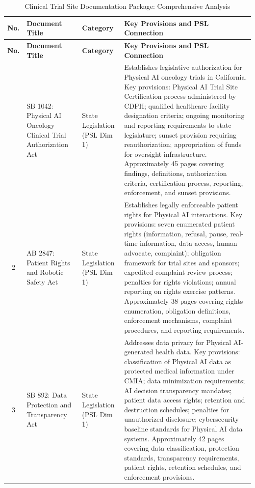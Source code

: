 \begin{longtable}{c l l p{8cm}}
\caption{Clinical Trial Site Documentation Package: Comprehensive Analysis}
\label{tab:site-docs-comprehensive} \\
\toprule
\textbf{No.} & \textbf{Document Title} & \textbf{Category} & \textbf{Key Provisions and PSL Connection} \\
\midrule
\endfirsthead
\toprule
\textbf{No.} & \textbf{Document Title} & \textbf{Category} & \textbf{Key Provisions and PSL Connection} \\
\midrule
\endhead
\bottomrule
\endfoot
1 & SB 1042: Physical AI Oncology Clinical Trial Authorization Act & State Legislation (PSL Dim 1) & Establishes legislative authorization for Physical AI oncology trials in California. Key provisions: Physical AI Trial Site Certification process administered by CDPH; qualified healthcare facility designation criteria; ongoing monitoring and reporting requirements to state legislature; sunset provision requiring reauthorization; appropriation of funds for oversight infrastructure. Approximately 45 pages covering findings, definitions, authorization criteria, certification process, reporting, enforcement, and sunset provisions. \\
2 & AB 2847: Patient Rights and Robotic Safety Act & State Legislation (PSL Dim 1) & Establishes legally enforceable patient rights for Physical AI interactions. Key provisions: seven enumerated patient rights (information, refusal, pause, real-time information, data access, human advocate, complaint); obligation framework for trial sites and sponsors; expedited complaint review process; penalties for rights violations; annual reporting on rights exercise patterns. Approximately 38 pages covering rights enumeration, obligation definitions, enforcement mechanisms, complaint procedures, and reporting requirements. \\
3 & SB 892: Data Protection and Transparency Act & State Legislation (PSL Dim 1) & Addresses data privacy for Physical AI-generated health data. Key provisions: classification of Physical AI data as protected medical information under CMIA; data minimization requirements; AI decision transparency mandates; patient data access rights; retention and destruction schedules; penalties for unauthorized disclosure; cybersecurity baseline standards for Physical AI data systems. Approximately 42 pages covering data classification, protection standards, transparency requirements, patient rights, retention schedules, and enforcement provisions. \\

\end{longtable}

